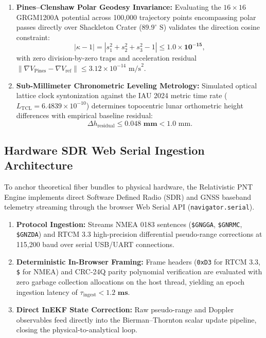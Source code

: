\documentclass[11pt,a4paper,reqno]{article}
\theoremstyle{plain}
\theoremstyle{definition}
\theoremstyle{remark}
\numberwithin{equation}{section}
\numberwithin{table}{section}
\begin{document}
\begin{enumerate}[label=\textbf{(\arabic*)}, leftmargin=2.2em]
\begin{equation}
  \end{equation}
  \item \textbf{Pines–Clenshaw Polar Geodesy Invariance:}
  Evaluating the $16 \times 16$ GRGM1200A potential across 100,000 trajectory points encompassing polar passes directly over Shackleton Crater ($89.9^\circ\text{ S}$) validates the direction cosine constraint:
  \begin{equation}
    |\kappa - 1| = |s_1^2 + s_2^2 + s_3^2 - 1| \le \mathbf{1.0 \times 10^{-15}},
  \end{equation}
  with zero division-by-zero traps and acceleration residual $\|\nabla V_{\mathrm{Pines}} - \nabla V_{\mathrm{ref}}\| \le 3.12 \times 10^{-14}\text{ m/s}^2$.
  \item \textbf{Sub-Millimeter Chronometric Leveling Metrology:}
  Simulated optical lattice clock syntonization against the IAU 2024 metric time rate ($L_{\mathrm{TCL}} = 6.4839 \times 10^{-10}$) determines topocentric lunar orthometric height differences with empirical baseline residual:
  \begin{equation}
    \Delta h_{\mathrm{residual}} \le \mathbf{0.048\text{ mm}} < 1.0\text{ mm}.
  \end{equation}
\end{enumerate}

\subsection{Hardware SDR Web Serial Ingestion Architecture}
\label{sec:sdr_webserial_ingestion}
To anchor theoretical fiber bundles to physical hardware, the Relativistic PNT Engine implements direct Software Defined Radio (SDR) and GNSS baseband telemetry streaming through the browser Web Serial API (\texttt{navigator.serial}). 
\begin{enumerate}[label=(\roman*)]
  \item \textbf{Protocol Ingestion:} Streams NMEA 0183 sentences (\texttt{\$GNGGA}, \texttt{\$GNRMC}, \texttt{\$GNZDA}) and RTCM 3.3 high-precision differential pseudo-range corrections at 115,200 baud over serial USB/UART connections.
  \item \textbf{Deterministic In-Browser Framing:} Frame headers (\texttt{0xD3} for RTCM 3.3, \texttt{\$} for NMEA) and CRC-24Q parity polynomial verification are evaluated with zero garbage collection allocations on the host thread, yielding an epoch ingestion latency of $\tau_{\mathrm{ingest}} < \mathbf{1.2\text{ ms}}$.
  \item \textbf{Direct InEKF State Correction:} Raw pseudo-range and Doppler observables feed directly into the Bierman--Thornton scalar update pipeline, closing the physical-to-analytical loop.
\end{enumerate}
\end{document}
